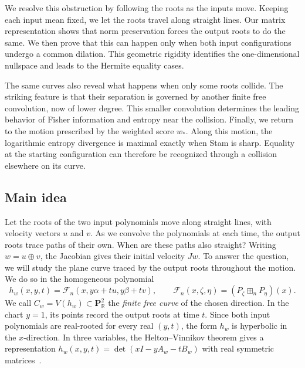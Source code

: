 \documentclass[12pt,reqno]{amsart}
\theoremstyle{definition}
\theoremstyle{remark}
\newcommand{\R}{\mathbb R}
\begin{document}
We resolve this obstruction by following the roots as the inputs move. Keeping each input mean fixed, we let the roots travel along straight lines. Our matrix representation shows that norm preservation forces the output roots to do the same. We then prove that this can happen only when both input configurations undergo a common dilation. This geometric rigidity identifies the one-dimensional nullspace and leads to the Hermite equality cases.

The same curves also reveal what happens when only some roots collide. The striking feature is that their separation is governed by another finite free convolution, now of lower degree. This smaller convolution determines the leading behavior of Fisher information and entropy near the collision. Finally, we return to the motion prescribed by the weighted score \(w_*\). Along this motion, the logarithmic entropy divergence is maximal exactly when Stam is sharp. Equality at the starting configuration can therefore be recognized through a collision elsewhere on its curve.

\subsection{Main idea}
Let the roots of the two input polynomials move along straight lines, with velocity vectors \(u\) and \(v\). As we convolve the polynomials at each time, the output roots trace paths of their own. When are these paths also straight? Writing \(w=u\oplus v\), the Jacobian gives their initial velocity \(Jw\). To answer the question, we will study the plane curve traced by the output roots throughout the motion. We do so in the homogeneous polynomial
\begin{equation}\label{eq:intro-ternary-form}
 h_w(x,y,t)=\mathcal F_n(x,y\alpha+tu,y\beta+tv),
 \qquad
 \mathcal F_n(x,\zeta,\eta)
       =(P_\zeta\boxplus_nP_\eta)(x).
\end{equation}
We call \(C_w=V(h_w)\subset\mathbf P^2_{\R}\) the \emph{finite free curve} of the chosen direction.  In the chart \(y=1\), its points record the output roots at time \(t\).  Since both input polynomials are real-rooted for every real \((y,t)\), the form \(h_w\) is hyperbolic in the \(x\)-direction.  In three variables, the Helton--Vinnikov theorem gives a representation \(h_w(x,y,t)=\det(xI-yA_w-tB_w)\) with real symmetric matrices~\cite{HeltonVinnikov07,LewisParriloRamana05}. 
\end{document}

